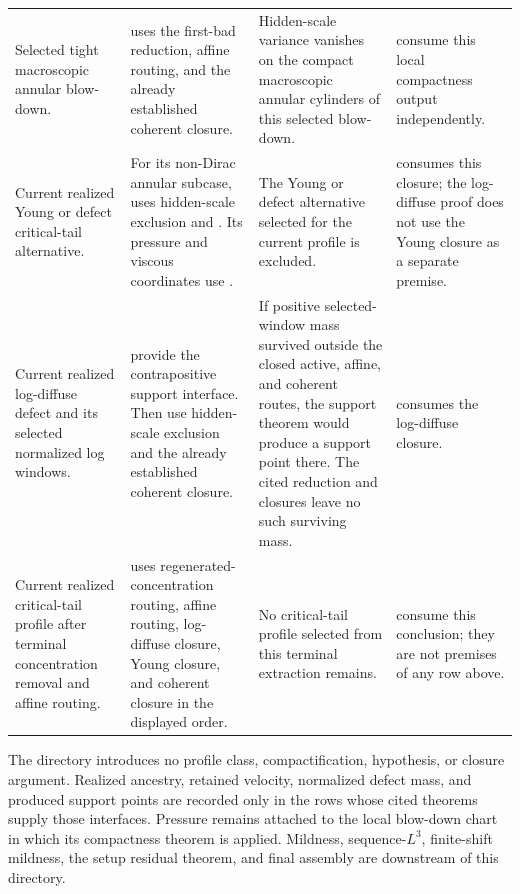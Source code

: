 \documentclass[11pt]{amsart}
\numberwithin{equation}{section}
\theoremstyle{plain}
\theoremstyle{definition}
\theoremstyle{remark}
\begin{document}
\begin{longtable}{@{}L{0.18\textwidth}L{0.25\textwidth}L{0.27\textwidth}L{0.22\textwidth}@{}}
Selected tight macroscopic annular blow-down. &
 uses the first-bad
reduction, affine routing, and the already established coherent closure. &
Hidden-scale variance vanishes on the compact macroscopic annular cylinders of
this selected blow-down. &
 consume
this local compactness output independently.\\

Current realized Young or defect critical-tail alternative. &
For its non-Dirac annular subcase,
 uses hidden-scale exclusion and
.  Its pressure and viscous
coordinates use . &
The Young or defect alternative selected for the current profile is excluded. &
 consumes this closure; the
log-diffuse proof does not use the Young closure as a separate premise.\\

Current realized log-diffuse defect and its selected normalized log windows. &
provide the contrapositive support interface.  Then
 use
hidden-scale exclusion and the already established coherent closure. &
If positive selected-window mass survived outside the closed active, affine,
and coherent routes, the support theorem would produce a support point there.
The cited reduction and closures leave no such surviving mass. &
 consumes the log-diffuse closure.\\

Current realized critical-tail profile after terminal concentration removal
and affine routing. &
 uses regenerated-concentration
routing, affine routing, log-diffuse closure, Young closure, and coherent
closure in the displayed order. &
No critical-tail profile selected from this terminal extraction remains. &
 consume this
conclusion; they are not premises of any row above.\\
\hline
\end{longtable}
\endgroup

The directory introduces no profile class, compactification, hypothesis, or
closure argument.  Realized ancestry, retained velocity, normalized defect
mass, and produced support points are recorded only in the rows whose cited
theorems supply those interfaces.  Pressure remains attached to the local
blow-down chart in which its compactness theorem is applied.  Mildness,
sequence-\(L^3\), finite-shift mildness, the setup residual theorem, and final
assembly are downstream of this directory.
\end{document}
